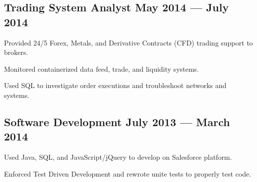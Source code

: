 \subsection{{Trading System Analyst \hfill May 2014 --- July 2014}}
\begin{zitemize}
\item Provided 24/5 Forex, Metals, and Derivative Contracts (CFD) trading support to brokers.
\item Monitored containerized data feed, trade, and liquidity systems.
\item Used SQL to investigate order executions and troubleshoot networks and systems.
\end{zitemize}

\subsection{{Software Development \hfill July 2013 --- March 2014}}
\begin{zitemize}
\item Used Java, SQL, and JavaScript/jQuery to develop on Salesforce platform.
\item Enforced Test Driven Development and rewrote unite tests to properly test code.
\end{zitemize}

